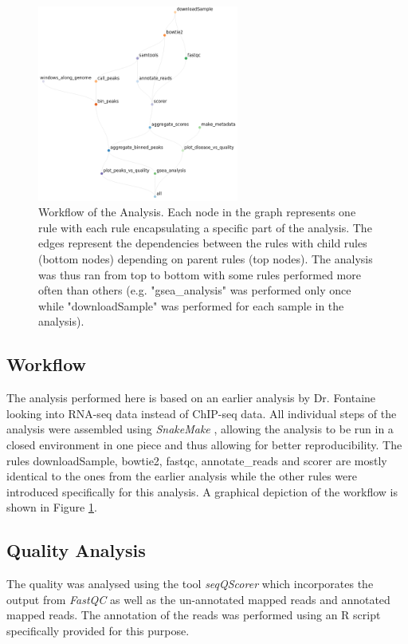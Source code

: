 \documentclass[5p]{elsarticle}
\begin{document}
\begin{figure}[t] %
	\centering
	
	\includegraphics[width=250px]{../figures/workflow.png}
	
	\caption{Workflow of the Analysis. Each node in the graph represents one rule with each rule encapsulating a specific part of the analysis. The edges represent the dependencies between the rules with child rules (bottom nodes) depending on parent rules (top nodes). The analysis was thus ran from top to bottom with some rules performed more often than others (e.g. "gsea\_analysis" was performed only once while "downloadSample" was performed for each sample in the analysis).}
	\label{figure1}
\end{figure}

\subsection{Workflow}
The analysis performed here is based on an earlier analysis by Dr. Fontaine looking into RNA-seq data instead of ChIP-seq data. All individual steps of the analysis were assembled using \textit{SnakeMake} \cite{koster_snakemakescalable_2012}, allowing the analysis to be run in a closed environment in one piece and thus allowing for better reproducibility. The rules downloadSample, bowtie2, fastqc, annotate\_reads and scorer are mostly identical to the ones from the earlier analysis while the other rules were introduced specifically for this analysis. A graphical depiction of the workflow is shown in Figure \ref{figure1}.

\subsection{Quality Analysis}
The quality was analysed using the tool \textit{seqQScorer} \cite{albrecht_automated_2020} which incorporates the output from \textit{FastQC} as well as the un-annotated mapped reads and annotated mapped reads. The annotation of the reads was performed using an R script specifically provided for this purpose.
\end{document}
